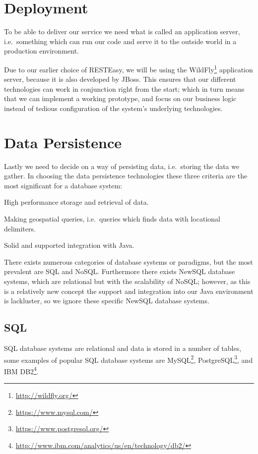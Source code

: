 \section{Deployment}
To be able to deliver our service we need what is called an application server, i.e.~something which can run our code and serve it to the outside world in a production environment.

Due to our earlier choice of RESTEasy, we will be using the WildFly\footnote{\url{http://wildfly.org/}} application server, because it is also developed by JBoss.
This ensures that our different technologies can work in conjunction right from the start;
which in turn means that we can implement a working prototype, and focus on our business logic instead of tedious configuration of the system's underlying technologies.

\section{Data Persistence}\label{subsec:datapersistence}
Lastly we need to decide on a way of persisting data, i.e.~storing the data we gather.
In choosing the data persistence technologies these three criteria are the most significant for a database system:
\begin{eletterate}
    \item High performance storage and retrieval of data.
    \item Making geospatial queries, i.e.~queries which finds data with locational delimiters.
    \item Solid and supported integration with Java.
\end{eletterate}


\bigskip
There exists numerous categories of database systems or paradigms, but the most prevalent are SQL and NoSQL.
Furthermore there exists NewSQL database systems, which are relational but with the scalability of NoSQL;
however, as this is a relatively new concept the support and integration into our Java environment is lackluster, so we ignore these specific NewSQL database systems.

\subsection{SQL}

SQL database systems are relational and data is stored in a number of tables, some examples of popular SQL database systems are MySQL\footnote{\url{https://www.mysql.com/}}, PostgreSQL\footnote{\url{https://www.postgresql.org/}}, and IBM DB2\footnote{\url{http://www.ibm.com/analytics/us/en/technology/db2/}}.\cite{DB_RANKINGS}

